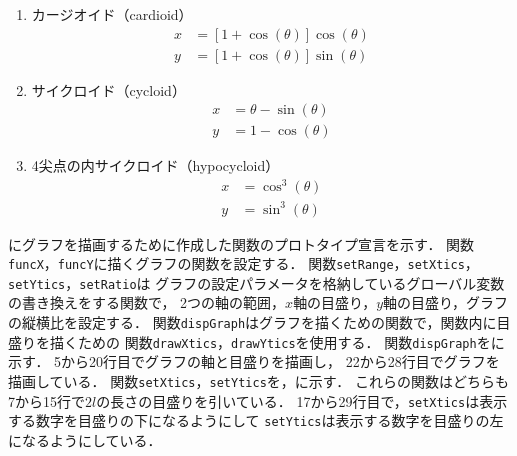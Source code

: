 
\begin{enumerate}
	\item カージオイド（cardioid）
	\begin{align}
		x &= [1 + \cos(\theta)]\cos(\theta)\label{equ:cardi-x}\\
		y &= [1 + \cos(\theta)]\sin(\theta)\label{equ:cardi-y}
	\end{align}
	\item サイクロイド（cycloid）
	\begin{align}
		x &= \theta - \sin(\theta)\label{equ:cycl-x}\\
		y &= 1 - \cos(\theta)\label{equ:cycl-y}
	\end{align}
	\item 4尖点の内サイクロイド（hypocycloid）
	\begin{align}
		x &= \cos^{3}(\theta)\label{equ:hypocycl-x}\\
		y &= \sin^{3}(\theta)\label{equ:hypocycl-y}
	\end{align}
\end{enumerate}



にグラフを描画するために作成した関数のプロトタイプ宣言を示す．
関数\texttt{funcX}，\texttt{funcY}に描くグラフの関数を設定する．
関数\texttt{setRange}，\texttt{setXtics}，\texttt{setYtics}，\texttt{setRatio}は
グラフの設定パラメータを格納しているグローバル変数の書き換えをする関数で，
2つの軸の範囲，$x$軸の目盛り，$y$軸の目盛り，グラフの縦横比を設定する．
関数\texttt{dispGraph}はグラフを描くための関数で，関数内に目盛りを描くための
関数\texttt{drawXtics}，\texttt{drawYtics}を使用する．
関数\texttt{dispGraph}をに示す．
5から20行目でグラフの軸と目盛りを描画し，
22から28行目でグラフを描画している．
関数\texttt{setXtics}，\texttt{setYtics}を，に示す．
これらの関数はどちらも7から15行で$2l$の長さの目盛りを引いている．
17から29行目で，\texttt{setXtics}は表示する数字を目盛りの下になるようにして
\texttt{setYtics}は表示する数字を目盛りの左になるようにしている．






